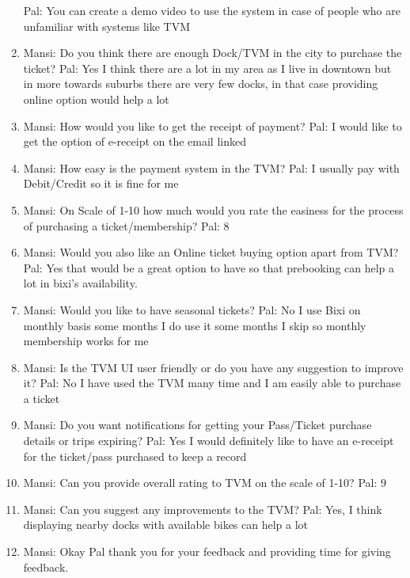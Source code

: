 \begin{enumerate}
    \newline Pal: You can create a demo video to use the system in case of people who are unfamiliar with systems like TVM
    \item Mansi: Do you think there are enough Dock/TVM in the city to purchase the ticket?
    \newline Pal: Yes I think there are a lot in my area as I live in downtown but in more towards suburbs there are very few docks, in that case providing online option would help a lot
    \item Mansi: How would you like to get the receipt of payment?
    \newline Pal: I would like to get the option of e-receipt on the email linked
    \item Mansi: How easy is the payment system in the TVM?
    \newline Pal: I usually pay with Debit/Credit so it is fine for me
    \item Mansi:  On Scale of 1-10 how much would you rate the easiness for the process of purchasing a ticket/membership?
    \newline Pal: 8
    \item Mansi: Would you also like an Online ticket buying option apart from TVM?
    \newline Pal: Yes that would be a great option to have so that prebooking can help a lot in bixi’s availability.
    \item Mansi: Would you like to have seasonal tickets?
    \newline Pal: No I use Bixi on monthly basis some months I do use it some months I skip so monthly membership works for me
    \item Mansi: Is the TVM UI user friendly or do you have any suggestion to improve it?
    \newline Pal: No I have used the TVM many time and I am easily able to purchase a ticket
    \item Mansi: Do you want notifications for getting your Pass/Ticket purchase details or trips expiring?
    \newline Pal: Yes I would definitely like to have an e-receipt for the ticket/pass purchased to keep a record
    \item Mansi: Can you provide overall rating to TVM on the scale of 1-10?
    \newline Pal: 9
    \item Mansi: Can you suggest any improvements to the TVM?
    \newline Pal: Yes, I think displaying nearby docks with available bikes can help a lot
    \item Mansi: Okay Pal thank you for your feedback and providing time for giving feedback. 
\end{enumerate}


